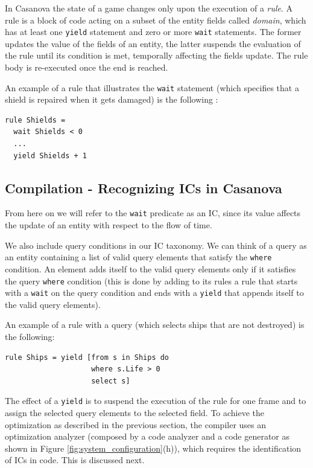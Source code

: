 In Casanova the state of a game changes only upon the execution of a \textit{rule}. A rule is a block of code acting on a subset of the entity fields called \textit{domain}, which has at least one \texttt{yield} statement and zero or more \texttt{wait} statements. The former updates the value of the fields of an entity, the latter suspends the evaluation of the rule until its condition is met, temporally affecting the fields update. The rule body is re-executed once the end is reached.

An example of a rule that illustrates the \texttt{wait} statement (which specifies that a shield is repaired when it gets damaged) is the following :
\begin{lstlisting}
rule Shields = 
  wait Shields < 0
  ...
  yield Shields + 1
\end{lstlisting}

\subsection{Compilation - Recognizing ICs in Casanova}
From here on we will refer to the \texttt{wait} predicate as an IC, since its value affects the update of an entity with respect to the flow of time.

We also include query conditions in our IC taxonomy. We can think of a query as an entity containing a list of valid query elements that satisfy the \texttt{where} condition. An element adds itself to the valid query elements only if it satisfies the query \texttt{where} condition (this is done by adding to its rules a rule that starts with a \texttt{wait} on the query condition and ends with a \texttt{yield} that appends itself to the valid query elements).

An example of a rule with a query (which selects ships that are not destroyed) is the following:
\begin{lstlisting}
rule Ships = yield [from s in Ships do
                    where s.Life > 0
                    select s]
\end{lstlisting}
The effect of a \texttt{yield} is to suspend the execution of the rule for one frame and to assign the selected query elements to the selected field. To achieve the optimization as described in the previous section, the compiler uses an optimization analyzer (composed by a code analyzer and a code generator as shown in Figure \ref{fig:system_configuration}(h)), which requires the identification of ICs in code. This is discussed next.

